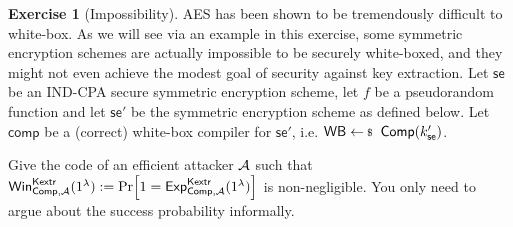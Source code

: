 \documentclass[envcountsame,runningheads,notitlepage]{../llncs}
\theoremstyle{definition}
\newtheorem{graded}[crossed]{Exercise}
\renewcommand{\O}[1]{\ensuremath{\mathsf{#1}}}
\renewcommand{\O}[1]{\ensuremath{\mathsf{#1}}}
\newcommand{\StyleModel}[1]{\O{{#1}}}
\newcommand{\WB}{\textsf{WB}}
\newcommand{\Comp}{\textsf{Comp}}
\newcommand{\se}{\StyleModel{se}}
\begin{document}
\begin{graded}[Impossibility]
AES has been shown to be tremendously difficult to white-box. As we will see via an example in this
exercise, some symmetric encryption schemes are actually impossible to be securely white-boxed, and they might not even achieve the modest goal of security against key extraction. Let $\se$ be an IND-CPA secure symmetric
encryption scheme, let $f$ be a pseudorandom function and let $\se'$ be the symmetric encryption scheme as defined below. Let $\O{comp}$ be a (correct) white-box compiler for $\se'$, i.e. $\WB \sample \Comp(k_\se')$.

Give the code of an efficient attacker $\mathcal{A}$ such that $\mathsf{Win}^{\mathsf{Kextr}}_{\Comp,\adv}(1^\lambda):=\prob{1={\mathsf{Exp}}_{\Comp,\adv}^{\mathsf{Kextr}}(1^\lambda)}$
is non-negligible. You only need to argue about the success probability informally.


\end{graded}
\end{document}
